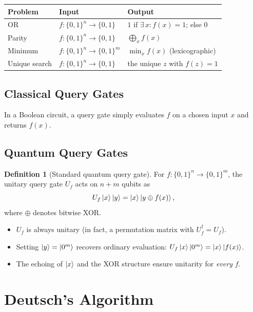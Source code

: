 \documentclass[11pt]{article}
\theoremstyle{definition}
\newtheorem{definition}{Definition}[section]
\begin{document}
\begin{center}
\begin{tabular}{lll}
\hline
\textbf{Problem} & \textbf{Input} & \textbf{Output} \\\hline
OR & $f:\{0,1\}^n\to\{0,1\}$ & $1$ if $\exists\,x: f(x)=1$; else $0$ \\
Parity & $f:\{0,1\}^n\to\{0,1\}$ & $\bigoplus_x f(x)$ \\
Minimum & $f:\{0,1\}^n\to\{0,1\}^m$ & $\min_x f(x)$ (lexicographic) \\
Unique search & $f:\{0,1\}^n\to\{0,1\}$ & the unique $z$ with $f(z)=1$ \\
\hline
\end{tabular}
\end{center}

\subsection{Classical Query Gates}

In a Boolean circuit, a query gate simply evaluates $f$ on a chosen input $x$ and returns $f(x)$.

\subsection{Quantum Query Gates}

\begin{definition}[Standard quantum query gate]
For $f:\{0,1\}^n\to\{0,1\}^m$, the unitary query gate $U_f$ acts on $n+m$ qubits as
\[
    U_f\ket{x}\ket{y} = \ket{x}\ket{y\oplus f(x)},
\]
where $\oplus$ denotes bitwise XOR.
\end{definition}

\begin{itemize}
    \item $U_f$ is always unitary (in fact, a permutation matrix with $U_f^\dagger = U_f$).
    \item Setting $\ket{y}=\ket{0^m}$ recovers ordinary evaluation: $U_f\ket{x}\ket{0^m}=\ket{x}\ket{f(x)}$.
    \item The echoing of $\ket{x}$ and the XOR structure ensure unitarity for \emph{every} $f$.
\end{itemize}

\section{Deutsch's Algorithm}
\end{document}
